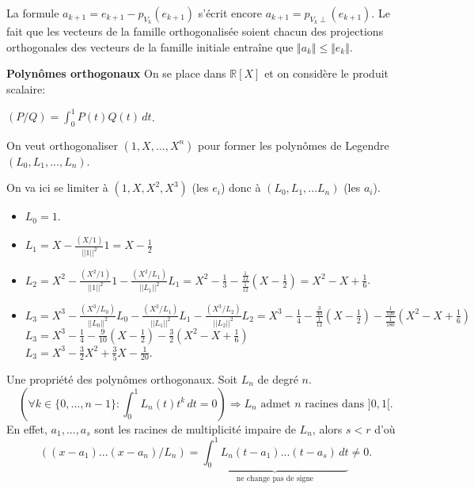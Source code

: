 \begin{rem}
 La formule $a_{k+1} = e_{k+1} - p_{V_{k}}(e_{k+1})$ s'écrit encore $a_{k+1} = p_{V_{k}\perp}(e_{k+1})$. Le fait que les vecteurs de la famille orthogonalisée soient chacun des projections orthogonales des vecteurs de la famille initiale entraîne que $\Vert a_k\Vert \leq \Vert e_k\Vert$.
\end{rem}

\clearpage
\begin{exple}
\textbf{Polynômes orthogonaux}
On se place dans $\mathbb{R}[X]$ et on considère le produit scalaire:

\begin{center}
$(P/Q) = \displaystyle \int_{0}^{1} P(t)Q(t) \, dt$.
\end{center}

On veut orthogonaliser $(1, X, ..., X^{n})$ pour former les polynômes de Legendre $(L_0, L_1, ..., L_n)$.

On va ici se limiter à $(1, X, X^2, X^3)$ (les $e_i$) donc à $(L_0, L_1, ... L_n)$ (les $a_i$).
\begin{itemize}
\item $L_0 = 1$.\medskip
\item $L_1 = \displaystyle X - \frac{ (X/1) }{ ||1||^2 } 1 = X - \frac{1}{2}$
\item $L_2 = \displaystyle X^2 - \frac{ (X^2/1) }{ ||1||^2 } 1 - \frac{ (X^2/L_1) }{ ||L_1||^2 } L_1 = X^2 - \frac{1}{3} - \frac{\frac{1}{12}}{\frac{1}{12}} \left( X - \frac{1}{2} \right) = X^2 - X + \frac{1}{6}$.\medskip
\item $L_3 = \displaystyle X^3 - \frac{(X^3/L_0)}{||L_0||^2} L_0 - \frac{ (X^3/L_1) }{ ||L_1||^2 } L_1 - \frac{ (X^3/L_2) }{ ||L_2||^2 } L_2 = X^3 - \frac{1}{4} - \frac{\frac{3}{40}}{\frac{1}{12}} \left( X - \frac{1}{2} \right) - \frac{\frac{1}{120}}{\frac{1}{180}} \left( X^2 - X + \frac{1}{6} \right)$ \\
$L_3 = X^3 - \frac{1}{4} - \frac{9}{10} \left( X - \frac{1}{2} \right) - \frac{3}{2} \left( X^2 - X + \frac{1}{6} \right)$ \medskip\\
$L_3 = X^3 - \frac{3}{2} X^2 + \frac{3}{5} X - \frac{1}{20}$.\medskip
\end{itemize}
\begin{rem}
 Une propriété des polynômes orthogonaux. 
Soit $L_n$ de degré $n$. 
\[
\left(  \forall k \in \{0, ..., n-1\} : \displaystyle \int_{0}^{1} L_{n}(t) t^{k} \, dt = 0 \right) \Rightarrow
L_n \text{ admet $n$ racines dans $]0,1[$.}
\]
En effet, $a_1, ..., a_s$ sont les racines de multiplicité impaire de $L_n$, alors $s < r$ d'où 
\[
\left( (x-a_1) ... (x-a_n) / L_n \right) = \displaystyle \underset{\textrm{ne change pas de signe}}{\underbrace{\int_{0}^{1} L_n(t-a_1)...(t-a_s) \, dt}} \neq 0.
\]
\end{rem}

\end{exple}

